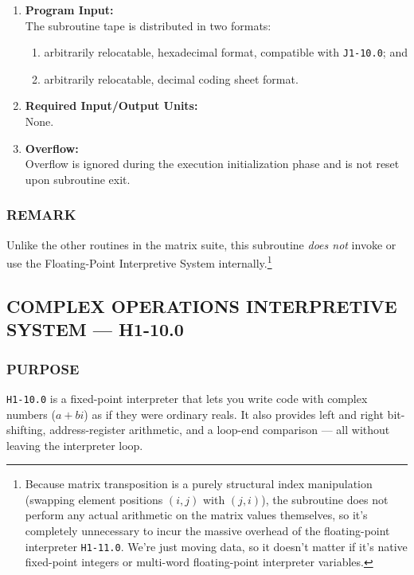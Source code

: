\begin{enumerate}[leftmargin=1.5em, itemsep=6pt]
    \item \textbf{Program Input:} \\
    The subroutine tape is distributed in two formats:
    \begin{enumerate}[label=\alph*), itemsep=2pt, topsep=2pt]
        \item arbitrarily relocatable, hexadecimal format, compatible with \texttt{J1-10.0}; and
        \item arbitrarily relocatable, decimal coding sheet format.
    \end{enumerate}
    
    \item \textbf{Required Input/Output Units:} \\
    None.
    
    \item \textbf{Overflow:} \\
    Overflow is ignored during the execution initialization phase and is not reset upon subroutine exit.
\end{enumerate}

\subsubsection*{REMARK}
Unlike the other routines in the matrix suite, this subroutine \emph{does not} invoke or use the Floating-Point Interpretive System internally.\footnote{Because matrix transposition is a purely structural index manipulation (swapping element positions $(i,j)$ with $(j,i)$), the subroutine does not perform any actual arithmetic on the matrix values themselves, so it's completely unnecessary to incur the massive overhead of the floating-point interpreter \texttt{H1-11.0}. We're just moving data, so it doesn't matter if it's native fixed-point integers or multi-word floating-point interpreter variables.}
\newpage
\subsection*{COMPLEX OPERATIONS INTERPRETIVE SYSTEM --- H1-10.0}
\label{subsec:complex_interpreter}

\subsubsection*{PURPOSE}
\texttt{H1-10.0} is a fixed-point interpreter that lets you write code with complex numbers ($a+bi$) as if they were ordinary reals. It also provides left and right bit-shifting, address-register arithmetic, and a loop-end comparison --- all without leaving the interpreter loop.

